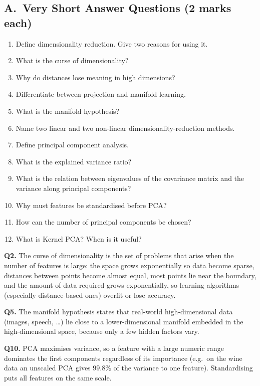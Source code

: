 \subsection*{A.\ Very Short Answer Questions (2 marks each)}
\begin{enumerate}
  \item Define dimensionality reduction. Give two reasons for using it. 
  \item What is the curse of dimensionality? 
  \item Why do distances lose meaning in high dimensions? 
  \item Differentiate between projection and manifold learning. 
  \item What is the manifold hypothesis? 
  \item Name two linear and two non-linear dimensionality-reduction methods. 
  \item Define principal component analysis. 
  \item What is the explained variance ratio? 
  \item What is the relation between eigenvalues of the covariance matrix and the variance along principal components? 
  \item Why must features be standardised before PCA? 
  \item How can the number of principal components be chosen? 
  \item What is Kernel PCA? When is it useful? 
\end{enumerate}

\begin{modelans}[: Q2, Q5 and Q10]
\textbf{Q2.} The curse of dimensionality is the set of problems that arise when the number of features is large: the space grows exponentially so data become sparse, distances between points become almost equal, most points lie near the boundary, and the amount of data required grows exponentially, so learning algorithms (especially distance-based ones) overfit or lose accuracy.\par
\textbf{Q5.} The manifold hypothesis states that real-world high-dimensional data (images, speech, \dots) lie close to a lower-dimensional manifold embedded in the high-dimensional space, because only a few hidden factors vary.\par
\textbf{Q10.} PCA maximises variance, so a feature with a large numeric range dominates the first components regardless of its importance (e.g.\ on the wine data an unscaled PCA gives $99.8\%$ of the variance to one feature). Standardising puts all features on the same scale.
\end{modelans}

